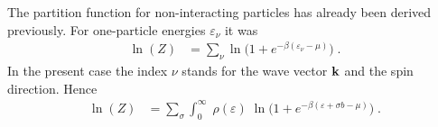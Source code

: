 %

%
The partition function for non-interacting particles has already been derived previously.
For one-particle energies $\varepsilon_{\nu}$ it was
%
\begin{align*}
\ln(Z) &= \sum_{\nu} \ln\bigg( 1+  e^{-\beta(\varepsilon_{\nu}-\mu)}\bigg)\;.
\end{align*}
%
In the present case the index $\nu$ stands for the wave vector $\mathbf k$ and the spin direction. Hence
%
\begin{align}\label{eq:para:pauli:ln:Z}
\ln(Z) 
&= \sum_{\sigma} \int_{0}^{\infty}\;\rho(\varepsilon)\;
\ln\bigg( 1+  e^{-\beta(\varepsilon+\sigma b-\mu)}\bigg)\;.
\end{align}
%

